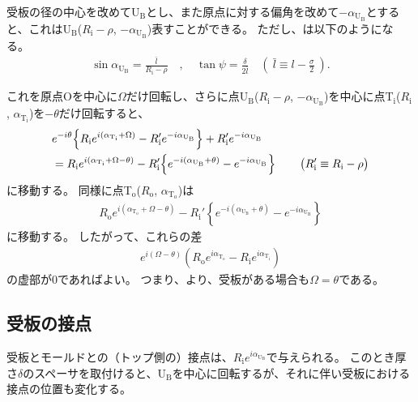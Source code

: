 受板の径の中心を改めてU$_\mathrm B$とし、また原点に対する偏角を改めて$-\alpha_{\mathrm U_\mathrm B}$とすると、これはU$_\mathrm B$($R_\mathrm i-\rho$, $-\alpha_{\mathrm U_\mathrm B}$)表すことができる。
ただし、は以下のようになる。
\begin{align*}
  \sin\alpha_{\mathrm U_\mathrm B} = \frac{\bar l}{R_\mathrm i-\rho}\quad, \quad
  \tan\psi = \frac\delta{2\bar l} \quad
  \left(~\bar l \equiv l-\frac\sigma2~\right).
\end{align*}

これを原点Oを中心に$\Omega$だけ回転し、さらに点U$_\mathrm B$($R_\mathrm i-\rho$, $-\alpha_{\mathrm U_\mathrm B}$)を中心に点T$_\mathrm i$($R_\mathrm i$, $\alpha_{\mathrm T_\mathrm i}$)を$-\theta$だけ回転すると、
\begin{align}
  \notag
  & e^{-i\theta}\!
    \left\{R_\mathrm ie^{i(\alpha_{\mathrm T_\mathrm i}+\Omega)}
           -R_\mathrm i'e^{-i\alpha_{\mathrm U_\mathrm B}}\right\}
    +R_\mathrm i'e^{-i\alpha_{\mathrm U_\mathrm B}}\\
  & = R_\mathrm ie^{i(\alpha_{\mathrm T_\mathrm i}+\Omega-\theta)}
      -R_\mathrm i'\!
       \left\{e^{-i(\alpha_{\mathrm U_\mathrm B}+\theta)}-e^{-i\alpha_{\mathrm U_\mathrm B}}\right\}\qquad
    \big(R_\mathrm i' \equiv R_\mathrm i-\rho\big)
    \label{eq:afterftUfinite}
\end{align}
に移動する。
同様に点T$_\mathrm o$($R_\mathrm o$, $\alpha_{\mathrm T_\mathrm o}$)は
\begin{align*}
  R_\mathrm oe^{i(\alpha_{\mathrm T_\mathrm o}+\Omega-\theta)}
  -R_\mathrm i'\!
   \left\{e^{-i(\alpha_{\mathrm U_\mathrm B} + \theta)} - e^{-i\alpha_{\mathrm U_\mathrm B}}\right\}
\end{align*}
に移動する。
したがって、これらの差
\begin{align*}
  e^{i(\Omega-\theta)}\!
  \left(R_\mathrm oe^{i\alpha_{\mathrm T_\mathrm o}} - R_\mathrm ie^{i\alpha_{\mathrm T_\mathrm i}}\right)
\end{align*}
の虚部が$0$であればよい。
つまり、より、受板がある場合も$\Omega = \theta$である。



\subsection{受板の接点}
受板とモールドとの（トップ側の）接点は、$R_\mathrm ie^{i\alpha_{\mathrm U_\mathrm B}}$で与えられる。
このとき厚さ$\delta$のスペーサを取付けると、U$_\mathrm B$を中心に回転するが、それに伴い受板における接点の位置も変化する。


